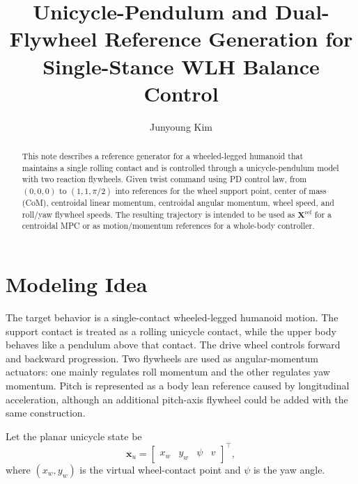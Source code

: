 \documentclass[letterpaper,10pt]{article}
\title{\LARGE \bf
Unicycle-Pendulum and Dual-Flywheel Reference Generation for Single-Stance WLH Balance Control
}
\author{Junyoung Kim}
\begin{document}
\maketitle

\begin{abstract}
This note describes a reference generator for a wheeled-legged humanoid that maintains a single rolling contact and is controlled through a unicycle-pendulum model with two reaction flywheels. Given twist command using PD control law, from \((0,0,0)\) to \((1,1,\pi/2)\) into references for the wheel support point, center of mass (CoM), centroidal linear momentum, centroidal angular momentum, wheel speed, and roll/yaw flywheel speeds. The resulting trajectory is intended to be used as \(\mathbf{X}^{\mathrm{ref}}\) for a centroidal MPC or as motion/momentum references for a whole-body controller.
\end{abstract}

\section{Modeling Idea}
The target behavior is a single-contact wheeled-legged humanoid motion. The support contact is treated as a rolling unicycle contact, while the upper body behaves like a pendulum above that contact. The drive wheel controls forward and backward progression. Two flywheels are used as angular-momentum actuators: one mainly regulates roll momentum and the other regulates yaw momentum. Pitch is represented as a body lean reference caused by longitudinal acceleration, although an additional pitch-axis flywheel could be added with the same construction.

Let the planar unicycle state be
\begin{equation}
\bm{x}_u =
\begin{bmatrix}
x_w & y_w & \psi & v
\end{bmatrix}^{\top},
\end{equation}
where \((x_w,y_w)\) is the virtual wheel-contact point and \(\psi\) is the yaw angle. 
\end{document}
